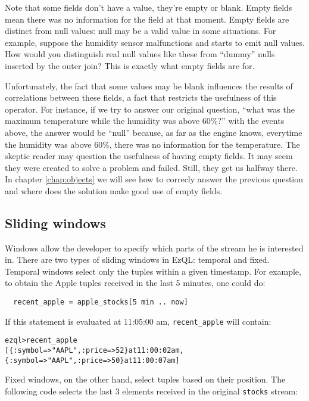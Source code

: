 \documentclass{report}
\newenvironment{evaluation}
{
  \framed
  \begin{alltt}
}
{
  \end{alltt}
  \endframed
}
\begin{document}
Note that some fields don't have a value, they're empty or
blank. Empty fields mean there was no information for the field at
that moment. Empty fields are distinct from null values: null may be a
valid value in some situations. For example, suppose the humidity
sensor malfunctions and starts to emit null values. How would you
distinguish real null values like these from ``dummy'' nulls inserted
by the outer join? This is exactly what empty fields are for.

Unfortunately, the fact that some values may be blank influences the
results of correlations between these fields, a fact that restricts
the usefulness of this operator. For instance, if we try to answer our
original question, ``what was the maximum temperature while the
humidity was above 60\%?'' with the events above, the answer would be
``null'' because, as far as the engine knows, everytime the humidity
was above 60\%, there was no information for the temperature. The
skeptic reader may question the usefulness of having empty fields. It
may seem they were created to solve a problem and failed. Still, they
get us halfway there. In chapter \ref{chap:objects} we will see how to
correcly answer the previous question and where does the solution make
good use of empty fields.

\subsection{Sliding windows}
\label{sec:sliding-windows}

Windows allow the developer to specify which parts of the stream he is
interested in. There are two types of sliding windows in EzQL:
temporal and fixed. Temporal windows select only the tuples within a
given timestamp. For example, to obtain the Apple tuples received in
the last 5 minutes, one could do:

\begin{verbatim}
  recent_apple = apple_stocks[5 min .. now]
\end{verbatim}

If this statement is evaluated at 11:05:00 am, \verb=recent_apple=
will contain:

\begin{evaluation}
  ezql> recent_apple
  [\{ :symbol => "AAPL", :price => 52 \} at 11:00:02 am,
   \{ :symbol => "AAPL", :price => 50 \} at 11:00:07 am]
\end{evaluation}

Fixed windows, on the other hand, select tuples based on their
position. The following code selects the last 3 elements received in
the original \verb=stocks= stream:
\end{document}
